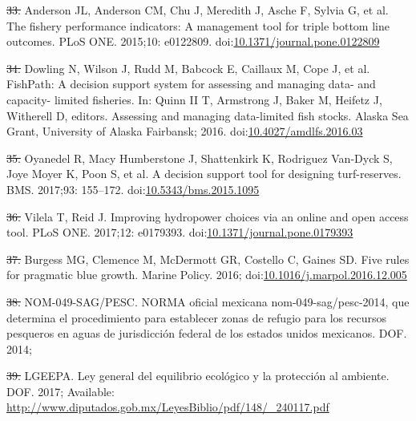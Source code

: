 \documentclass[12pt,]{article}
\providecommand{\DIFaddtex}[1]{{\protect\color{blue}\uwave{#1}}} %
\providecommand{\DIFdeltex}[1]{{\protect\color{red}\sout{#1}}}                      %
\providecommand{\DIFaddbegin}{} %
\providecommand{\DIFaddend}{} %
\providecommand{\DIFdelbegin}{} %
\providecommand{\DIFdelend}{} %
\providecommand{\DIFadd}[1]{\texorpdfstring{\DIFaddtex{#1}}{#1}} %
\providecommand{\DIFdel}[1]{\texorpdfstring{\DIFdeltex{#1}}{}} %
\newcommand{\DIFscaledelfig}{0.5}
\newlength{\DIFdelgraphicswidth} %
\newlength{\DIFdelgraphicsheight} %
\newcommand{\DIFaddincludegraphics}[2][]{{\color{blue}\fbox{\DIFOincludegraphics[#1]{#2}}}} %
\newcommand{\DIFdelincludegraphics}[2][]{%
\sbox{\DIFdelgraphicsbox}{\DIFOincludegraphics[#1]{#2}}%
\settoboxwidth{\DIFdelgraphicswidth}{\DIFdelgraphicsbox} %
\settoboxtotalheight{\DIFdelgraphicsheight}{\DIFdelgraphicsbox} %
\scalebox{\DIFscaledelfig}{%
\parbox[b]{\DIFdelgraphicswidth}{\usebox{\DIFdelgraphicsbox}\\[-\baselineskip] \rule{\DIFdelgraphicswidth}{0em}}\llap{\resizebox{\DIFdelgraphicswidth}{\DIFdelgraphicsheight}{%
\setlength{\unitlength}{\DIFdelgraphicswidth}%
\begin{picture}(1,1)%
\thicklines\linethickness{2pt} %
{\color[rgb]{1,0,0}\put(0,0){\framebox(1,1){}}}%
{\color[rgb]{1,0,0}\put(0,0){\line( 1,1){1}}}%
{\color[rgb]{1,0,0}\put(0,1){\line(1,-1){1}}}%
\end{picture}%
}\hspace*{3pt}}} %
} %
\DeclareRobustCommand{\DIFaddbegin}{\DIFOaddbegin \let\includegraphics\DIFaddincludegraphics} %
\DeclareRobustCommand{\DIFaddend}{\DIFOaddend \let\includegraphics\DIFOincludegraphics} %
\DeclareRobustCommand{\DIFdelbegin}{\DIFOdelbegin \let\includegraphics\DIFdelincludegraphics} %
\DeclareRobustCommand{\DIFdelend}{\DIFOaddend \let\includegraphics\DIFOincludegraphics} %
\begin{document}
\hypertarget{ref-anderson_2015-ND}{}
\DIFdelbegin \DIFdel{33. }\DIFdelend \DIFaddbegin \DIFadd{34. }\DIFaddend Anderson JL, Anderson CM, Chu J, Meredith J, Asche F, Sylvia G, et
al. The fishery performance indicators: A management tool for triple
bottom line outcomes. PLoS ONE. 2015;10: e0122809.
doi:\href{https://doi.org/10.1371/journal.pone.0122809}{10.1371/journal.pone.0122809}

\hypertarget{ref-dowling_2016-pO}{}
\DIFdelbegin \DIFdel{34. }\DIFdelend \DIFaddbegin \DIFadd{35. }\DIFaddend Dowling N, Wilson J, Rudd M, Babcock E, Caillaux M, Cope J, et al.
FishPath: A decision support system for assessing and managing data- and
capacity- limited fisheries. In: Quinn II T, Armstrong J, Baker M,
Heifetz J, Witherell D, editors. Assessing and managing data-limited
fish stocks. Alaska Sea Grant, University of Alaska Fairbansk; 2016.
doi:\href{https://doi.org/10.4027/amdlfs.2016.03}{10.4027/amdlfs.2016.03}

\hypertarget{ref-oyanedel_2017-TO}{}
\DIFdelbegin \DIFdel{35. }\DIFdelend \DIFaddbegin \DIFadd{36. }\DIFaddend Oyanedel R, Macy Humberstone J, Shattenkirk K, Rodriguez Van-Dyck S,
Joye Moyer K, Poon S, et al. A decision support tool for designing
turf-reserves. BMS. 2017;93: 155--172.
doi:\href{https://doi.org/10.5343/bms.2015.1095}{10.5343/bms.2015.1095}

\hypertarget{ref-vilela_2017-Zo}{}
\DIFdelbegin \DIFdel{36. }\DIFdelend \DIFaddbegin \DIFadd{37. }\DIFaddend Vilela T, Reid J. Improving hydropower choices via an online and
open access tool. PLoS ONE. 2017;12: e0179393.
doi:\href{https://doi.org/10.1371/journal.pone.0179393}{10.1371/journal.pone.0179393}

\hypertarget{ref-burgess_2016-HN}{}
\DIFdelbegin \DIFdel{37. }\DIFdelend \DIFaddbegin \DIFadd{38. }\DIFaddend Burgess MG, Clemence M, McDermott GR, Costello C, Gaines SD. Five
rules for pragmatic blue growth. Marine Policy. 2016;
doi:\href{https://doi.org/10.1016/j.marpol.2016.12.005}{10.1016/j.marpol.2016.12.005}

\hypertarget{ref-nom049sagpesc_2014-V6}{}
\DIFdelbegin \DIFdel{38. }\DIFdelend \DIFaddbegin \DIFadd{39. }\DIFaddend NOM-049-SAG/PESC. NORMA oficial mexicana nom-049-sag/pesc-2014, que
determina el procedimiento para establecer zonas de refugio para los
recursos pesqueros en aguas de jurisdicción federal de los estados
unidos mexicanos. DOF. 2014;

\hypertarget{ref-lgeepa_2017-jL}{}
\DIFdelbegin \DIFdel{39. }\DIFdelend \DIFaddbegin \DIFadd{40. }\DIFaddend LGEEPA. Ley general del equilibrio ecológico y la protección al
ambiente. DOF. 2017; Available:
\url{http://www.diputados.gob.mx/LeyesBiblio/pdf/148/_240117.pdf}
\end{document}
